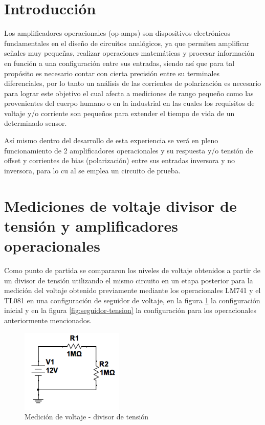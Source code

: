 
\section*{Introducción}
Los amplificadores operacionales (op-amps) son dispositivos electrónicos fundamentales en el diseño de circuitos analógicos, ya que permiten amplificar señales muy pequeñas, realizar operaciones matemáticas y procesar información en función a una configuración entre sus entradas, siendo así que para tal propósito es necesario contar con cierta precisión entre su terminales diferenciales, por lo tanto un análisis de las corrientes de polarización es necesario para lograr este objetivo el cual afecta a mediciones de rango pequeño como las provenientes del cuerpo humano o en la industrial en las cuales los requisitos de voltaje y/o corriente son pequeños para extender el tiempo de vida de un determinado sensor.

Así mismo dentro del desarrollo de esta experiencia se verá en pleno funcionamiento de 2 amplificadores operacionales y su respuesta y/o tensión de offset y corrientes de bias (polarización) entre sus entradas inversora y no inversora, para lo cu	al se emplea un circuito de prueba.


\section{ Mediciones de voltaje divisor de tensión y amplificadores operacionales}

Como punto de partida se compararon los niveles de voltaje obtenidos a partir de un divisor de tensión utilizando el mismo circuito en un etapa posterior para la medición del voltaje obtenido previamente mediante los operacionales LM741 y el TL081 en una configuración de seguidor de voltaje, en la figura \ref{fig:divisor-tension} la configuración inicial y en la figura \ref{fig:seguidor-tension} la configuración para los operacionales anteriormente mencionados.

\begin{figure}[h]
	\centering
	\includegraphics[width=0.3\linewidth]{media/divisor-tension}
	\caption{Medición de voltaje - divisor de tensión}
	\label{fig:divisor-tension}
\end{figure}

